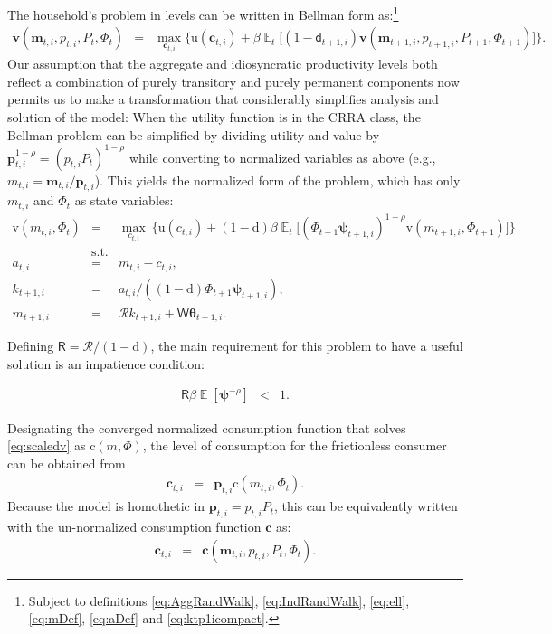 \documentclass[titlepage]{article}
\DeclareMathOperator{\Ex}{\mathbb{E}} %
\begin{document}
The household's problem in levels can be written in Bellman form as:\footnote{Subject to definitions \eqref{eq:AggRandWalk}, \eqref{eq:IndRandWalk}, \eqref{eq:ell}, \eqref{eq:mDef}, \eqref{eq:aDef} and \eqref{eq:ktp1icompact}.}
\begin{eqnarray*}
\textbf{v}(\mathbf{m}_{t,i},p_{t,i},P_t,\Phi_t)  & = &  \max_{\mathbf{c}_{t,i}}  \big\{ {\mathrm{u}}(\mathbf{c}_{t,i}) + \beta \Ex_t \big[(1-\mathsf{d}_{t+1,i})\textbf{v}(\mathbf{m}_{t+1,i},p_{t+1,i},P_{t+1},\Phi_{t+1})\big] \big\}. \nonumber
\end{eqnarray*}
Our assumption that the aggregate and idiosyncratic productivity levels both reflect a combination of purely transitory and purely permanent components now permits us to make a transformation that considerably simplifies analysis and solution of the model: When the utility function is in the CRRA class, the Bellman problem can be simplified by dividing utility and value by $\pmb{p}_{t,i}^{1-\rho} = (p_{t,i}P_t)^{1-\rho}$ while converting to normalized variables as above (e.g., $m_{t,i}=\mathbf{m}_{t,i}/\pmb{p}_{t,i}$). This yields the normalized form of the problem, which has only $m_{t,i}$ and $\Phi_t$ as state variables:
\begin{eqnarray}
    \mathrm{v}({m}_{t,i},\Phi_t) & = & \max_{c_{t,i}} ~ \big\{ {\mathrm{u}}(c_{t,i}) + (1-\mathrm{d}) \beta
    \Ex_{t}\big[ (\Phi_{t+1} \pmb{\psi}_{t+1,i})^{1-\rho}\mathrm{v}(m_{t+1,i},\Phi_{t+1})\big] \big\}
    \label{eq:scaledv}
\\  & \mbox{s.t.} & \nonumber
\\    a_{t,i}   & = & m_{t,i} - c_{t,i}, \nonumber
\\    k_{t+1,i} & = & a_{t,i} \big/( (1-\mathrm{d}) \Phi_{t+1} \pmb{\psi}_{t+1,i} ),  \nonumber
\\    m_{t+1,i} & = & \mathscr{R} k_{t+1,i} + \mathsf{W} \pmb{\theta}_{t+1,i}.  \nonumber
\end{eqnarray}
 
Defining $\mathsf{R} = \mathscr{R}\big/(1-\mathrm{d})$, the main requirement for this problem to have a useful solution is an impatience condition: 

\begin{eqnarray*}
  \label{eq:impatience}
  \mathsf{R} \beta  \Ex[ \pmb{\psi}^{-\rho}]  & < & 1.
\end{eqnarray*}
 
Designating the converged normalized consumption function that solves \eqref{eq:scaledv} as
$\mathrm{c}(m,\Phi)$, the level of consumption for the frictionless consumer can be obtained from
\begin{eqnarray}
  \label{eq:cFlevel}
   \mathbf{c}_{t,i} & = & \pmb{p}_{t,i} \mathrm{c}(m_{t,i},\Phi_t)  \nonumber
.
\end{eqnarray}
 Because the model is homothetic in $\pmb{p}_{t,i}={p}_{t,i} {P}_{t}$, this can be equivalently written with the un-normalized consumption function $\textbf{c}$ as:
\begin{eqnarray*}
\mathbf{c}_{t,i} & = & \textbf{c}(\mathbf{m}_{t,i}, p_{t,i}, {P}_t, {\Phi}_t).
\end{eqnarray*}
\end{document}
